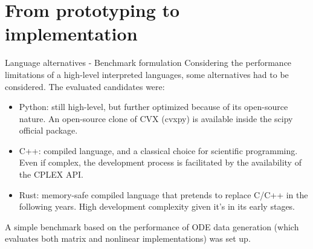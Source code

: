 \documentclass{beamer}
\begin{document}
\section{From prototyping to implementation}

\begin{frame}{Language alternatives - Benchmark formulation}
    Considering the performance limitations of a high-level interpreted languages, some alternatives had to be considered. The evaluated candidates were:

    \begin{itemize}
        \item Python: still high-level, but further optimized because of its open-source nature. An open-source clone of CVX (cvxpy) is available inside the scipy official package.
        \item C++: compiled language, and a classical choice for scientific programming. Even if complex, the development process is facilitated by the availability of the CPLEX API.
        \item Rust: memory-safe compiled language that pretends to replace C/C++ in the following years. High development complexity given it's in its early stages.
    \end{itemize}

    A simple benchmark based on the performance of ODE data generation (which evaluates both matrix and nonlinear implementations) was set up.
\end{frame}
\end{document}
